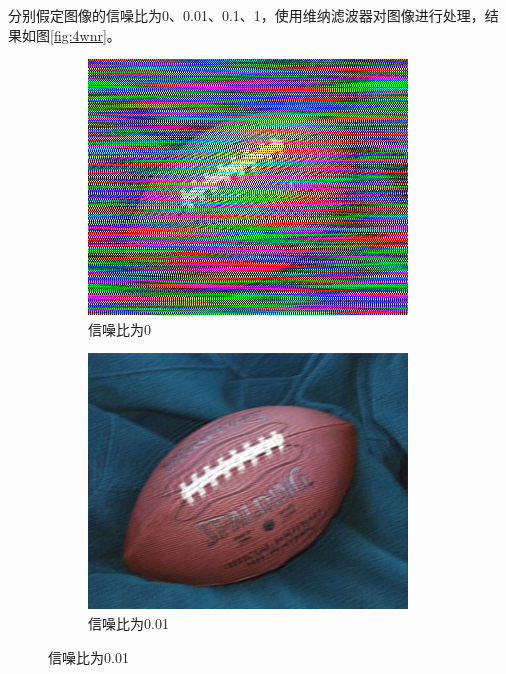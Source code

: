 \documentclass[a4paper]{ctexart}
\newcommand{\outwfour}{0.23\textwidth}
\begin{document}
\begin{spacing}{1.35}
	分别假定图像的信噪比为0、0.01、0.1、1，使用维纳滤波器对图像进行处理，结果如图\ref{fig:4wnr}。
	\begin{figure}[htbp]
		\centering
		\begin{subfigure}[t]{\outwfour}
			\centering
			\includegraphics[width=\textwidth]{figure/deconvwnr1.png}
			\caption{信噪比为0}
		\end{subfigure}
		\begin{subfigure}[t]{\outwfour}
			\centering
			\includegraphics[width=\textwidth]{figure/deconvwnr2.png}
			\caption{信噪比为0.01}
		\end{subfigure}

\end{figure}
\end{spacing}
\end{document}
